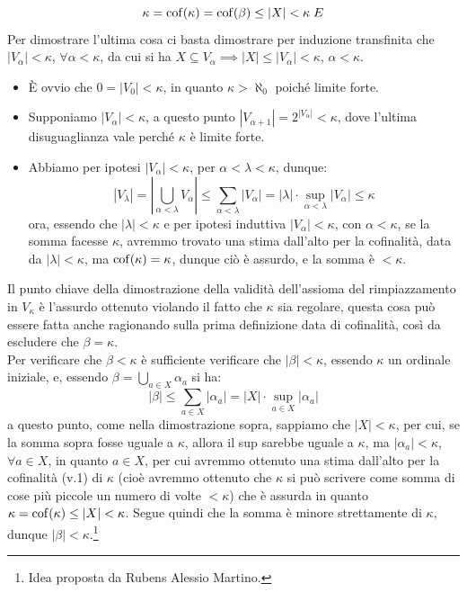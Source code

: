 \begin{soln}
\begin{enumerate}[(1)]
		\[ \kappa = \cof(\kappa) = \cof(\beta) \leq |X| < \kappa \; \lightning
			\]
		Per dimostrare l'ultima cosa ci basta dimostrare per induzione transfinita che $|V_\alpha| < \kappa$, $\forall \alpha < \kappa$, da cui si ha $X \subseteq V_\alpha \implies |X| \leq |V_\alpha| < \kappa$, $\alpha < \kappa$.
		\begin{itemize}
			\item[$\boxed{\text{caso 0}}$] \`E ovvio che $0 = |V_0| < \kappa$, in quanto $\kappa > \aleph_0$ poich\'e limite forte. 
			\item[$\boxed{\text{caso successore}}$] Supponiamo $|V_\alpha| < \kappa$, a questo punto $|V_{\alpha + 1}| = 2^{|V_\alpha|} < \kappa$, dove l'ultima disuguaglianza vale perch\'e $\kappa$ \`e limite forte.
			\item[$\boxed{\text{caso limite}}$] Abbiamo per ipotesi $|V_\alpha| < \kappa$, per $\alpha < \lambda < \kappa$, dunque:
			\[ |V_\lambda| = \left\lvert \bigcup_{\alpha < \lambda} V_\alpha\right\rvert \leq \sum_{\alpha < \lambda} |V_\alpha| = |\lambda| \cdot \sup_{\alpha < \lambda} |V_\alpha| \leq \kappa
				\]
			ora, essendo che $|\lambda| < \kappa$ e per ipotesi induttiva $|V_\alpha| < \kappa$, con $\alpha < \kappa$, se la somma facesse $\kappa$, avremmo trovato una stima dall'alto per la cofinalit\`a, data da $|\lambda| < \kappa$, ma $\operatorname{cof}(\kappa) = \kappa$, dunque ci\`o \`e assurdo, e la somma \`e $<\kappa$.
		\end{itemize}
	\end{enumerate}
\end{soln}

\begin{remark}
	Il punto chiave della dimostrazione della validit\`a dell'assioma del rimpiazzamento in $V_\kappa$ \`e l'assurdo ottenuto violando il fatto che $\kappa$ sia regolare, questa cosa pu\`o essere fatta anche ragionando sulla prima definizione data di cofinalit\`a, cos\`i da escludere che $\beta = \kappa$.\\
	Per verificare che $\beta < \kappa$ \`e sufficiente verificare che $|\beta| < \kappa$, essendo $\kappa$ un ordinale iniziale, e, essendo $\beta = \bigcup_{a \in X} \alpha_a$ si ha:
	\[ |\beta| \leq \sum_{a \in X} |\alpha_a| = |X| \cdot \sup_{a \in X} |\alpha_a|
		\]
	a questo punto, come nella dimostrazione sopra, sappiamo che $|X| < \kappa$, per cui, se la somma sopra fosse uguale a $\kappa$, allora il sup sarebbe uguale a $\kappa$, ma $|\alpha_a| < \kappa$, $\forall a \in X$, in quanto $a \in X$, per cui avremmo ottenuto una stima dall'alto per la cofinalit\`a (v.1) di $\kappa$ (cio\`e avremmo ottenuto che $\kappa$ si pu\`o scrivere come somma di cose pi\`u piccole
	un numero di volte $< \kappa$) che \`e assurda in quanto $\kappa = \operatorname{cof}(\kappa) \leq |X| < \kappa$. Segue quindi che la somma \`e minore strettamente di $\kappa$, dunque $|\beta| < \kappa$.\footnote{Idea proposta da Rubens Alessio Martino.}
\end{remark}

